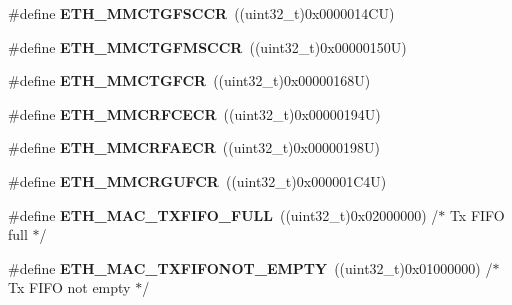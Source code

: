 \begin{DoxyCompactItemize}
\#define {\bfseries E\+T\+H\+\_\+\+M\+M\+C\+T\+G\+F\+S\+C\+CR}~((uint32\+\_\+t)0x0000014\+C\+U)
\item 
\mbox{\label{group___h_a_l___e_t_h___aliased___defines_gad2324378454cb5afc2709afc6849067d}} 
\#define {\bfseries E\+T\+H\+\_\+\+M\+M\+C\+T\+G\+F\+M\+S\+C\+CR}~((uint32\+\_\+t)0x00000150\+U)
\item 
\mbox{\label{group___h_a_l___e_t_h___aliased___defines_ga1de87b7bf29865be1068300dd2946caf}} 
\#define {\bfseries E\+T\+H\+\_\+\+M\+M\+C\+T\+G\+F\+CR}~((uint32\+\_\+t)0x00000168\+U)
\item 
\mbox{\label{group___h_a_l___e_t_h___aliased___defines_gacb9b04ab9c5957905a2db7314d6907b8}} 
\#define {\bfseries E\+T\+H\+\_\+\+M\+M\+C\+R\+F\+C\+E\+CR}~((uint32\+\_\+t)0x00000194\+U)
\item 
\mbox{\label{group___h_a_l___e_t_h___aliased___defines_ga99f6ddc380fffdfe66e6659f7c4ba325}} 
\#define {\bfseries E\+T\+H\+\_\+\+M\+M\+C\+R\+F\+A\+E\+CR}~((uint32\+\_\+t)0x00000198\+U)
\item 
\mbox{\label{group___h_a_l___e_t_h___aliased___defines_gadd605f380a482a06a59498eea4cad15f}} 
\#define {\bfseries E\+T\+H\+\_\+\+M\+M\+C\+R\+G\+U\+F\+CR}~((uint32\+\_\+t)0x000001\+C4\+U)
\item 
\mbox{\label{group___h_a_l___e_t_h___aliased___defines_ga568f5f8aa8a6dc34f446e303adac0e6d}} 
\#define {\bfseries E\+T\+H\+\_\+\+M\+A\+C\+\_\+\+T\+X\+F\+I\+F\+O\+\_\+\+F\+U\+LL}~((uint32\+\_\+t)0x02000000)  /$\ast$ Tx F\+I\+F\+O full $\ast$/
\item 
\mbox{\label{group___h_a_l___e_t_h___aliased___defines_ga4c428a862f392d95b5dd889e8cd96924}} 
\#define {\bfseries E\+T\+H\+\_\+\+M\+A\+C\+\_\+\+T\+X\+F\+I\+F\+O\+N\+O\+T\+\_\+\+E\+M\+P\+TY}~((uint32\+\_\+t)0x01000000)  /$\ast$ Tx F\+I\+F\+O not empty $\ast$/
\item 
\mbox{\label{group___h_a_l___e_t_h___aliased___defines_gaff6cebd747512114367fa01ef36e0394}} 

\end{DoxyCompactItemize}
